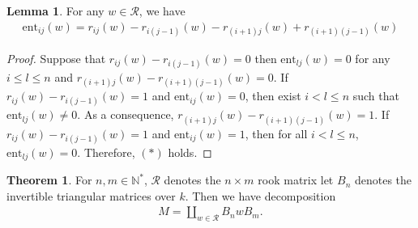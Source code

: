 \documentclass[10pt,UTF8]{article}
\theoremstyle{definition}
\renewcommand{\qed}{\rightline{$\qedsymbol$}}
\newcommand{\ent}{\text{ent}}
\newtheorem{theorem}[definition]{Theorem}
\newtheorem{lemma}[definition]{Lemma}
\newtheorem*{proof}{Proof}
\begin{document}
\begin{lemma}
  For any $w\in \mathcal{R}$, we have\label{rpr}
  \begin{align*}
    \ent_{ij}(w) = r_{ij}(w) -  r_{i(j-1)}(w) -  r_{(i+1)j}(w) + r_{(i+1)(j-1)}(w) \tag{$*$} 
  \end{align*}
\end{lemma}
\begin{proof}
  Suppose that $r_{ij}(w) -  r_{i(j-1)}(w) =0$ then $\ent_{lj}(w)=0$ for any $i\le l\le n$ and 
  $r_{(i+1)j}(w) - r_{(i+1)(j-1)}(w)=0$.
  If $r_{ij}(w) -  r_{i(j-1)}(w) = 1$ and $\ent_{ij}(w)=0$, then exist $i<l\le n$ such that $\ent_{lj}(w)\neq 0$. 
  As a consequence, $r_{(i+1)j}(w) - r_{(i+1)(j-1)}(w)=1$.
  If $r_{ij}(w) -  r_{i(j-1)}(w) = 1$ and $\ent_{ij}(w)=1$, then for all $i<l\le n$,  $\ent_{lj}(w)= 0$.
  Therefore, $(*)$ holds.

  \qed
\end{proof}


\begin{theorem}
  For $n,m\in \mathbb{N}^*$, $\mathcal{R}$ denotes the $n\times m$ rook matrix let $B_n$ denotes the invertible triangular matrices over $k$. Then
  we have decomposition 
  \begin{align*}
    M = \coprod_{w\in \mathcal{R}} B_nwB_m.
  \end{align*}
  \end{theorem}
  
\end{document}
